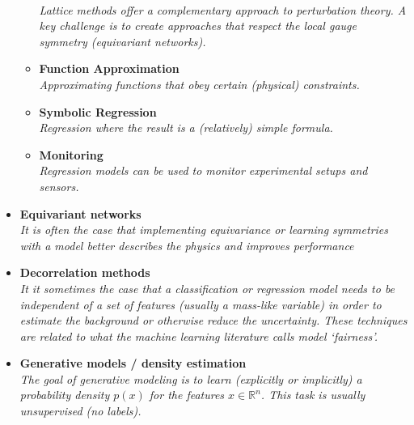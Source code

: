 \documentclass[12pt,letterpaper]{article}
\begin{document}
\begin{itemize}
\begin{itemize}
		\\\textit{Lattice methods offer a complementary approach to perturbation theory.  A key challenge is to create approaches that respect the local gauge symmetry (equivariant networks).}
		\item \textbf{Function Approximation}~\cite{1853982,Haddadin:2021mmo,Chahrour:2021eiv,Wang:2021jou,Kitouni:2021fkh,Lei:2022dvn,Wang:2023nab,Fernando:2023obn}
		\\\textit{Approximating functions that obey certain (physical) constraints.}
		\item \textbf{Symbolic Regression}~\cite{Butter:2021rvz,Zhang:2022uqk,Lu:2022joy,Wang:2023poi}
                \\\textit{Regression where the result is a (relatively) simple formula.}
                \item \textbf{Monitoring}~\cite{Mukund:2023oyy,Matha:2023tmf,CMSMuon:2023czf,Joshi:2023btt,Chen:2023cim}
		\\\textit{Regression models can be used to monitor experimental setups and sensors.}
	\end{itemize}
\item \textbf{Equivariant networks}~\cite{Kanwar:2003.06413,Dolan:2020qkr,Favoni:2020reg,Bulusu:2021njs,Gong:2022lye,Shi:2022yqw,Bogatskiy:2022hub,Favoni:2022mcg,Bogatskiy:2022czk,Lehner:2023bba,Forestano:2023fpj,Aronsson:2023rli,Buhmann:2023pmh,Forestano:2023qcy,Lehner:2023prf,Murnane:2023kfm,Bogatskiy:2023nnw}
\\\textit{It is often the case that implementing equivariance or learning symmetries with a model better describes the physics and improves performance}
\item \textbf{Decorrelation methods}~\cite{Louppe:2016ylz,Dolen:2016kst,Moult:2017okx,Stevens:2013dya,Shimmin:2017mfk,Bradshaw:2019ipy,ATL-PHYS-PUB-2018-014,DiscoFever,Xia:2018kgd,Englert:2018cfo,Wunsch:2019qbo,Rogozhnikov:2014zea,10.1088/2632-2153/ab9023,clavijo2020adversarial,Kasieczka:2020pil,Kitouni:2020xgb,Ghosh:2021hrh,Dolan:2021pml,Mikuni:2021nwn,Klein:2022hdv,Das:2022cjl,Algren:2023spv}
\\\textit{It it sometimes the case that a classification or regression model needs to be independent of a set of features (usually a mass-like variable) in order to estimate the background or otherwise reduce the uncertainty.  These techniques are related to what the machine learning literature calls model `fairness'.}
\item \textbf{Generative models / density estimation}
\\\textit{The goal of generative modeling is to learn (explicitly or implicitly) a probability density $p(x)$ for the features $x\in\mathbb{R}^n$.  This task is usually unsupervised (no labels).}

\end{itemize}
\end{document}
